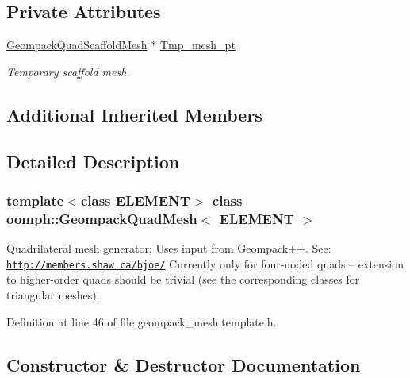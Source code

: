 \subsection*{Private Attributes}
\begin{DoxyCompactItemize}
\item 
\hyperlink{classoomph_1_1GeompackQuadScaffoldMesh}{Geompack\+Quad\+Scaffold\+Mesh} $\ast$ \hyperlink{classoomph_1_1GeompackQuadMesh_a0b7edabf329aed8f4fb00eddb41b3299}{Tmp\+\_\+mesh\+\_\+pt}
\begin{DoxyCompactList}\small\item\em Temporary scaffold mesh. \end{DoxyCompactList}\end{DoxyCompactItemize}
\subsection*{Additional Inherited Members}


\subsection{Detailed Description}
\subsubsection*{template$<$class E\+L\+E\+M\+E\+NT$>$\newline
class oomph\+::\+Geompack\+Quad\+Mesh$<$ E\+L\+E\+M\+E\+N\+T $>$}

Quadrilateral mesh generator; Uses input from Geompack++. See\+: \href{http://members.shaw.ca/bjoe/}{\tt http\+://members.\+shaw.\+ca/bjoe/} Currently only for four-\/noded quads -- extension to higher-\/order quads should be trivial (see the corresponding classes for triangular meshes). 

Definition at line 46 of file geompack\+\_\+mesh.\+template.\+h.



\subsection{Constructor \& Destructor Documentation}
\mbox{\label{classoomph_1_1GeompackQuadMesh_aa1de3a1b4fedf1c404d6ed5bbebfb800}} 
